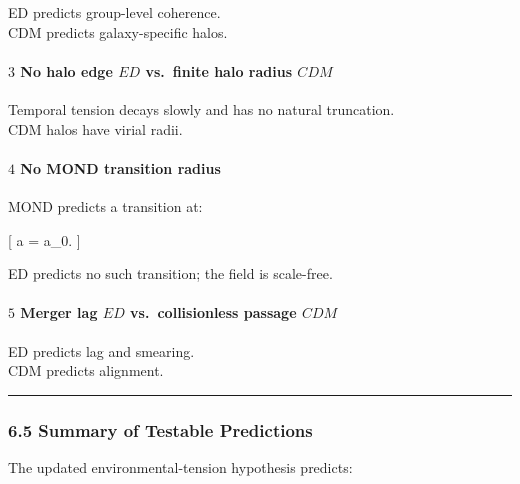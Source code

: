ED predicts group-level coherence.\\
CDM predicts galaxy-specific halos.

\paragraph{\texorpdfstring{\textbf{\(3\) No halo edge \(ED\) vs.~finite
halo radius
\(CDM\)}}{3 No halo edge ED vs.~finite halo radius CDM}}\label{no-halo-edge-ed-vs.-finite-halo-radius-cdm}

Temporal tension decays slowly and has no natural truncation.\\
CDM halos have virial radii.

\paragraph{\texorpdfstring{\textbf{\(4\) No MOND transition
radius}}{4 No MOND transition radius}}\label{no-mond-transition-radius}

MOND predicts a transition at:

{[} a = a\_0.  {]}

ED predicts no such transition; the field is scale-free.

\paragraph{\texorpdfstring{\textbf{\(5\) Merger lag \(ED\)
vs.~collisionless passage
\(CDM\)}}{5 Merger lag ED vs.~collisionless passage CDM}}\label{merger-lag-ed-vs.-collisionless-passage-cdm}

ED predicts lag and smearing.\\
CDM predicts alignment.

\begin{center}\rule{0.5\linewidth}{0.5pt}\end{center}

\subsubsection{6.5 Summary of Testable
Predictions}\label{summary-of-testable-predictions}

The updated environmental-tension hypothesis predicts:

